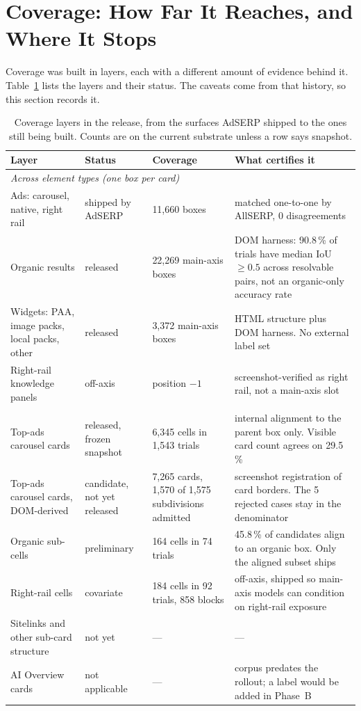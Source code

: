 \documentclass[sigconf,authorversion,natbib=true]{acmart}
\begin{document}
\section{Coverage: How Far It Reaches, and Where It Stops}\label{sec:coverage}

Coverage was built in layers, each with a different amount of evidence behind it. Table~\ref{tab:coverage} lists the layers and their status. The caveats come from that history, so this section records it.

\begin{table}[t]
  \caption{Coverage layers in the release, from the surfaces AdSERP shipped to the ones still being built. Counts are on the current substrate unless a row says snapshot.}
  \label{tab:coverage}
  \small
  \begin{tabular}{p{3.6cm}p{2.2cm}p{3.4cm}p{6.6cm}}
    \toprule
    Layer & Status & Coverage & What certifies it \\
    \midrule
    \multicolumn{4}{l}{\emph{Across element types (one box per card)}} \\
    Ads: carousel, native, right rail & shipped by AdSERP & 11,660 boxes & matched one-to-one by AllSERP, 0 disagreements \\
    Organic results & released & 22,269 main-axis boxes & DOM harness: 90.8\,\% of trials have median IoU $\geq 0.5$ across resolvable pairs, not an organic-only accuracy rate \\
    Widgets: PAA, image packs, local packs, other & released & 3,372 main-axis boxes & HTML structure plus DOM harness. No external label set \\
    Right-rail knowledge panels & off-axis & position $-1$ & screenshot-verified as right rail, not a main-axis slot \\
    \addlinespace
    \multicolumn{4}{l}{\emph{Within element types (cells inside a card)}} \\
    Top-ads carousel cards & released, frozen snapshot & 6,345 cells in 1,543 trials & internal alignment to the parent box only. Visible card count agrees on 29.5\,\% \\
    Top-ads carousel cards, DOM-derived & candidate, not yet released & 7,265 cards, 1,570 of 1,575 subdivisions admitted & screenshot registration of card borders. The 5 rejected cases stay in the denominator \\
    Organic sub-cells & preliminary & 164 cells in 74 trials & 45.8\,\% of candidates align to an organic box. Only the aligned subset ships \\
    Right-rail cells & covariate & 184 cells in 92 trials, 858 blocks & off-axis, shipped so main-axis models can condition on right-rail exposure \\
    Sitelinks and other sub-card structure & not yet & --- & --- \\
    AI Overview cards & not applicable & --- & corpus predates the rollout; a label would be added in Phase~B \\
    \bottomrule
  \end{tabular}
\end{table}
\end{document}
